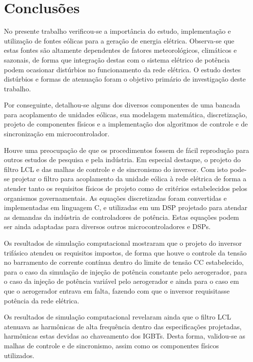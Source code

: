 \chapter{Conclusões}

No presente trabalho verificou-se a importância do estudo, implementação e utilização de fontes eólicas 
para a geração de energia elétrica. Observa-se que estas fontes são altamente dependentes de fatores meteorológicos, 
climáticos e sazonais, de forma que integração destas com o sistema elétrico de potência podem ocasionar distúrbios 
no funcionamento da rede elétrica. 
O estudo destes distúrbios e formas de atenuação foram o objetivo primário de investigação deste trabalho.

Por conseguinte, detalhou-se alguns dos diversos componentes de uma bancada para acoplamento de unidades eólicas, 
sua modelagem matemática, discretização, projeto de componentes físicos e a implementação dos algoritmos de controle
e de sincronização em microcontrolador.

Houve uma preocupação de que os procedimentos fossem de fácil reprodução para outros estudos de pesquisa e 
pela indústria. Em especial destaque, o projeto do filtro LCL e das malhas de controle e de sincronismo do inversor.
Com isto pode-se projetar o filtro para acoplamento da  unidade eólica à rede elétrica de forma a atender 
tanto os requisitos físicos de projeto como de critérios estabelecidos pelos organismos governamentais. 
As equações discretizadas foram convertidas e implementadas em linguagem C, e utilizadas em um DSP projetado 
para atendar as demandas da indústria de controladores de potência. 
Estas equações podem ser ainda adaptadas para diversos outros microcontroladores e DSPs.

Os resultados de simulação computacional mostraram que o projeto do inversor trifásico atendeu os requisitos
impostos, de forma que houve o controle da tensão no barramento de corrente contínua dentro do limite de tensão CC estabelecido,
para o caso da simulação de injeção de potência constante pelo aerogerador, para o caso da injeção de potência variável pelo aerogerador 
e ainda para o caso em que o aerogerador entrava em falta, fazendo com que o inversor requisitasse potência da rede elétrica. 

Os resultados de simulação computacional revelaram ainda que o filtro LCL atenuava as harmônicas de alta frequência dentro 
das especificações projetadas, harmônicas estas devidas ao chaveamento dos IGBTs.
Desta forma, validou-se as malhas de controle e de sincronismo, assim como os componentes físicos utilizados.

